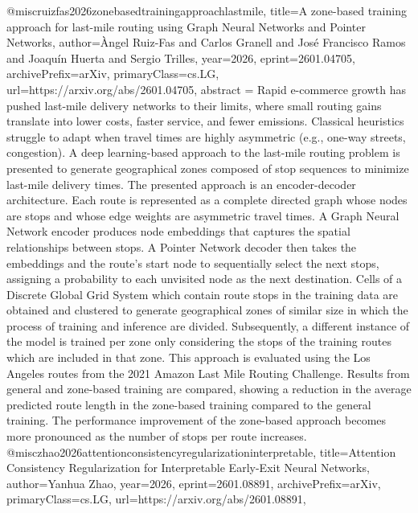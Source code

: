 {}@misc{ruizfas2026zonebasedtrainingapproachlastmile,
      title={A zone-based training approach for last-mile routing using Graph Neural Networks and Pointer Networks}, 
      author={Àngel Ruiz-Fas and Carlos Granell and José Francisco Ramos and Joaquín Huerta and Sergio Trilles},
      year={2026},
      eprint={2601.04705},
      archivePrefix={arXiv},
      primaryClass={cs.LG},
      url={https://arxiv.org/abs/2601.04705},
      abstract = {Rapid e-commerce growth has pushed last-mile delivery networks to their limits, where small routing gains translate into lower costs, faster service, and fewer emissions. Classical heuristics struggle to adapt when travel times are highly asymmetric (e.g., one-way streets, congestion). A deep learning-based approach to the last-mile routing problem is presented to generate geographical zones composed of stop sequences to minimize last-mile delivery times.   The presented approach is an encoder-decoder architecture. Each route is represented as a complete directed graph whose nodes are stops and whose edge weights are asymmetric travel times. A Graph Neural Network encoder produces node embeddings that captures the spatial relationships between stops. A Pointer Network decoder then takes the embeddings and the route's start node to sequentially select the next stops, assigning a probability to each unvisited node as the next destination.   Cells of a Discrete Global Grid System which contain route stops in the training data are obtained and clustered to generate geographical zones of similar size in which the process of training and inference are divided. Subsequently, a different instance of the model is trained per zone only considering the stops of the training routes which are included in that zone.   This approach is evaluated using the Los Angeles routes from the 2021 Amazon Last Mile Routing Challenge. Results from general and zone-based training are compared, showing a reduction in the average predicted route length in the zone-based training compared to the general training. The performance improvement of the zone-based approach becomes more pronounced as the number of stops per route increases.}
}@misc{zhao2026attentionconsistencyregularizationinterpretable,
      title={Attention Consistency Regularization for Interpretable Early-Exit Neural Networks}, 
      author={Yanhua Zhao},
      year={2026},
      eprint={2601.08891},
      archivePrefix={arXiv},
      primaryClass={cs.LG},
      url={https://arxiv.org/abs/2601.08891},
}

